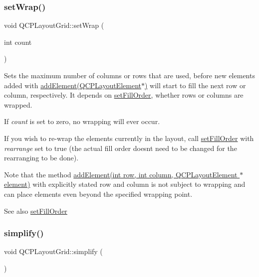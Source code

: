\subsubsection{\texorpdfstring{set\+Wrap()}{setWrap()}}
{\footnotesize\ttfamily void Q\+C\+P\+Layout\+Grid\+::set\+Wrap (\begin{DoxyParamCaption}\item[{int}]{count }\end{DoxyParamCaption})}

Sets the maximum number of columns or rows that are used, before new elements added with \hyperlink{classQCPLayoutGrid_a4c44025dd25acd27e053cadfd448ad7b}{add\+Element(\+Q\+C\+P\+Layout\+Element$\ast$)} will start to fill the next row or column, respectively. It depends on \hyperlink{classQCPLayoutGrid_affc2f3cfd22f28698c5b29b960d2a391}{set\+Fill\+Order}, whether rows or columns are wrapped.

If {\itshape count} is set to zero, no wrapping will ever occur.

If you wish to re-\/wrap the elements currently in the layout, call \hyperlink{classQCPLayoutGrid_affc2f3cfd22f28698c5b29b960d2a391}{set\+Fill\+Order} with {\itshape rearrange} set to true (the actual fill order doesn\textquotesingle{}t need to be changed for the rearranging to be done).

Note that the method \hyperlink{classQCPLayoutGrid_adff1a2ca691ed83d2d24a4cd1fe17012}{add\+Element(int row, int column, Q\+C\+P\+Layout\+Element $\ast$element)} with explicitly stated row and column is not subject to wrapping and can place elements even beyond the specified wrapping point.

\begin{DoxySeeAlso}{See also}
\hyperlink{classQCPLayoutGrid_affc2f3cfd22f28698c5b29b960d2a391}{set\+Fill\+Order} 
\end{DoxySeeAlso}
\mbox{\label{classQCPLayoutGrid_a38621ca7aa633b6a9a88617df7f08672}} 
\subsubsection{\texorpdfstring{simplify()}{simplify()}}
{\footnotesize\ttfamily void Q\+C\+P\+Layout\+Grid\+::simplify (\begin{DoxyParamCaption}{ }\end{DoxyParamCaption})\hspace{0.3cm}{\ttfamily [virtual]}}

